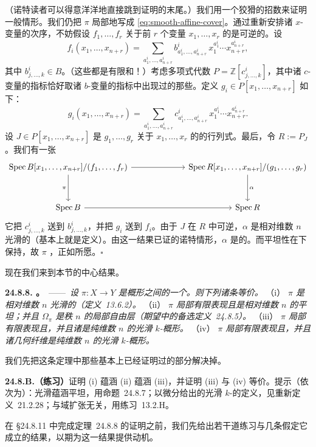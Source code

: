 （诺特读者可以得意洋洋地直接跳到证明的末尾。）我们用一个狡猾的招数来证明一般情形。我们仍把 $\pi$ 局部地写成 \eqref{eq:smooth-affine-cover}。通过重新安排诸 $x$-变量的次序，不妨假设 $f_1,\dots,f_r$ 关于前 $r$ 个变量 $x_1,\dots,x_r$ 的\trJacobianMatrix{}是可逆的。设
\[
f_i(x_1,\dots,x_{n+r})=\sum_{a^i_1,\dots,a^i_{n+r}}b^i_{a^i_1,\dots,a^i_{n+r}}\,x_1^{a^i_1}\cdots x_{n+r}^{a^i_{n+r}},
\]
其中 $b^i_{j,\dots,k}\in B$。（这些都是有限和！）考虑多项式代数 $P=\mathbb{Z}[c^i_{j,\dots,k}]$，其中诸 $c$-变量的指标恰好取诸 $b$-变量的指标中出现过的那些。定义 $g_i\in P[x_1,\dots,x_{n+r}]$ 如下：
\[
g_i(x_1,\dots,x_{n+r})=\sum_{a^i_1,\dots,a^i_{n+r}}c^i_{a^i_1,\dots,a^i_{n+r}}\,x_1^{a^i_1}\cdots x_{n+r}^{a^i_{n+r}}.
\]
设 $J\in P[x_1,\dots,x_{n+r}]$ 是 $g_1,\dots,g_r$ 关于 $x_1,\dots,x_r$ 的\trJacobianMatrix{}的行列式。最后，令 $R:=P_J$。我们有一张\trCartesianDiagram
\[
\begin{tikzcd}[row sep=3.2em, column sep=6.5em]
\Spec B[x_1,\dots,x_{n+r}]/(f_1,\dots,f_r) \ar[r] \ar[d, "\pi"'] & \Spec R[x_1,\dots,x_{n+r}]/(g_1,\dots,g_r) \ar[d, "\alpha"] \\
\Spec B \ar[r] & \Spec R
\end{tikzcd}
\]
它把 $c^i_{j,\dots,k}$ 送到 $b^i_{j,\dots,k}$，并把 $g_i$ 送到 $f_i$。由于 $J$ 在 $R$ 中可逆，$\alpha$ 是相对维数 $n$ 光滑的（基本上就是定义）。由这一结果已证的诺特情形，$\alpha$ 是\trFlat{}的。而平坦性在\trBaseChange{}下保持，故 $\pi$ \trFlat，正如所愿。\hfill$\square$

现在我们来到本节的中心结果。

\textbf{24.8.8. \trhTheorem。}\ ——\ \emph{设 $\pi\colon X\to Y$ 是概形之间的一个\trMorphism。则下列诸条等价。}
（i）\emph{\trMorphism{} $\pi$ 是相对维数 $n$ 光滑的（\mbox{定义~13.6.2}）。}
（ii）\emph{\trMorphism{} $\pi$ 局部有限表现且是相对维数 $n$ 的平坦；并且 $\Omega_\pi$ 是秩 $n$ 的局部自由层（\mbox{期望中的备选定义~24.8.5}）。}
（iii）\emph{\trMorphism{} $\pi$ 局部有限表现且\trFlat，并且诸\trFiber{}是纯维数 $n$ 的光滑 $k$-概形。}
（iv）\emph{\trMorphism{} $\pi$ 局部有限表现且\trFlat，并且诸几何纤维是纯维数 $n$ 的光滑 $k$-概形。}

我们先把这条定理中那些基本上已经证明过的部分解决掉。

\textbf{24.8.B.（练习）}\quad 证明 (i) 蕴涵 (ii) 蕴涵 (iii)，并证明 (iii) 与 (iv) 等价。提示（依次为）：光滑蕴涵平坦，用\mbox{命题~24.8.7}；以微分给出的光滑 $k$-\trVariety{}的定义，见\mbox{重新定义~21.2.28}；\trSmoothness{}与域扩张无关，用\mbox{练习~13.2.H}。

在 \S24.8.11 中完成\mbox{定理~24.8.8} 的证明之前，我们先给出若干道练习与几条假定它成立的结果，以期为这一结果提供动机。

